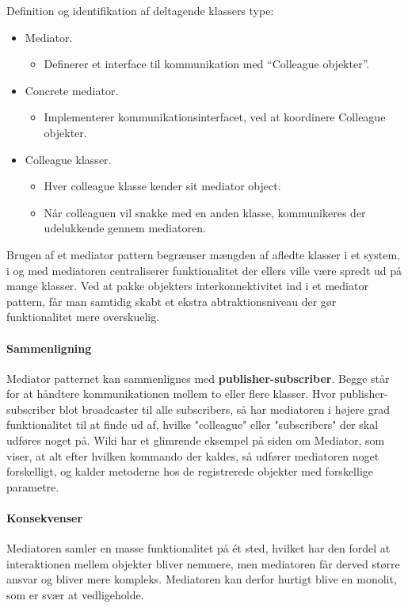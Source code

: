 Definition og identifikation af deltagende klassers type:

\begin{itemize}
	\item Mediator.
	\begin{itemize}
		\item 	Definerer et interface til kommunikation med “Colleague objekter”.
	\end{itemize}
	\item Concrete mediator.
	\begin{itemize}
		\item 	Implementerer kommunikationsinterfacet, ved at koordinere Colleague objekter.
	\end{itemize}
	\item Colleague klasser.
	\begin{itemize}
		\item Hver colleague klasse kender sit mediator object.
		\item Når colleaguen vil snakke med en anden klasse, kommunikeres der udelukkende gennem mediatoren.
	\end{itemize}
\end{itemize}

Brugen af et mediator pattern begrænser mængden af afledte klasser i et system, i og med mediatoren centraliserer funktionalitet der ellers ville være spredt ud på mange klasser. Ved at pakke objekters interkonnektivitet ind i et mediator pattern, får man samtidig skabt et ekstra abtraktionsniveau der gør funktionalitet mere overskuelig.

\paragraph{Sammenligning}

Mediator patternet kan sammenlignes med \textbf{publisher-subscriber}. Begge står for at håndtere kommunikationen mellem to eller flere klasser. Hvor publisher-subscriber blot broadcaster til alle subscribers, så har mediatoren i højere grad funktionalitet til at finde ud af, hvilke "colleague" eller "subscribers" der skal udføres noget på. Wiki har et glimrende eksempel på siden om Mediator, som viser, at alt efter hvilken kommando der kaldes, så udfører mediatoren noget forskelligt, og kalder metoderne hos de registrerede objekter med forskellige parametre.

\paragraph{Konsekvenser}
Mediatoren samler en masse funktionalitet på ét sted, hvilket har den fordel at interaktionen mellem objekter bliver nemmere, men mediatoren får derved større ansvar og bliver mere kompleks. Mediatoren kan derfor hurtigt blive en monolit, som er svær at vedligeholde.

